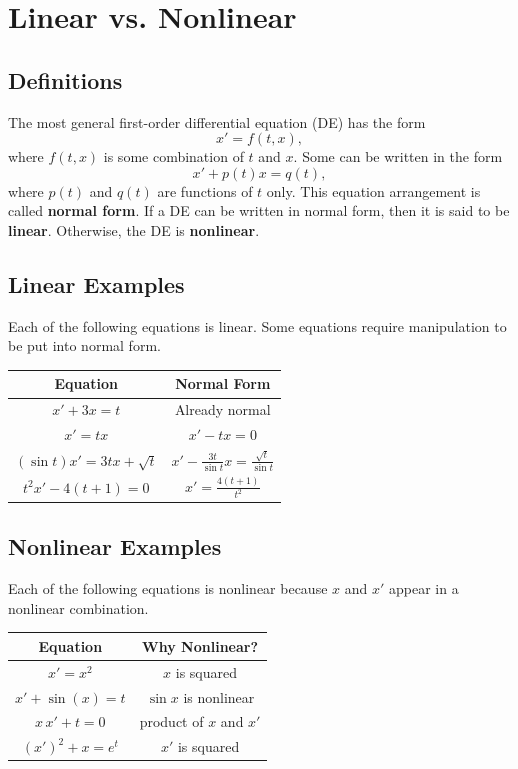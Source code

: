 \documentclass[10pt,letterpaper]{article}
\begin{document}


\section{Linear vs. Nonlinear}

\subsection{Definitions}
The most general first-order differential equation (DE) has the form
\[
x' = f(t,x),
\]
where $f(t,x)$ is some combination of $t$ and $x$. Some can be written in the form
\[
x' + p(t)x = q(t),
\]
where $p(t)$ and $q(t)$ are functions of $t$ only. This equation arrangement is called \textbf{normal form}. If a DE can be written in normal form, then it is said to be \textbf{linear}. Otherwise, the DE is \textbf{nonlinear}. 

\subsection{Linear Examples}
Each of the following equations is linear. Some equations require manipulation to be put into normal form. 

\begin{center}
\begin{tabular}{c c}
\hline
Equation & Normal Form\\
\hline
$x' + 3x = t$ & Already normal \\[1mm]
$x' = tx$ & $x'-tx = 0$ \\[1mm]
$(\sin t)x' = 3tx + \sqrt{t}$ & $x' - \frac{3t}{\sin t} x=\frac{\sqrt{t}}{\sin t}$ \\[1mm]
$t^2x' - 4(t+1) = 0$ & $x' =\frac{4(t+1)}{t^2}$ \\[1mm]
\hline
\end{tabular}
\end{center}

\subsection{Nonlinear Examples}
Each of the following equations is nonlinear because $x$ and $x'$ appear in a nonlinear combination.

\begin{center}
\begin{tabular}{c c}
\hline
Equation & Why Nonlinear? \\
\hline
$x' = x^2$ & $x$ is squared \\[1mm]
$x' + \sin(x) = t$ &$\sin x$ is nonlinear\\[1mm]
$x\,x' + t = 0$ & product of $x$ and $x'$ \\[1mm]
$(x')^2 + x = e^t$ & $x'$ is squared \\
\hline
\end{tabular}
\end{center}
\end{document}
